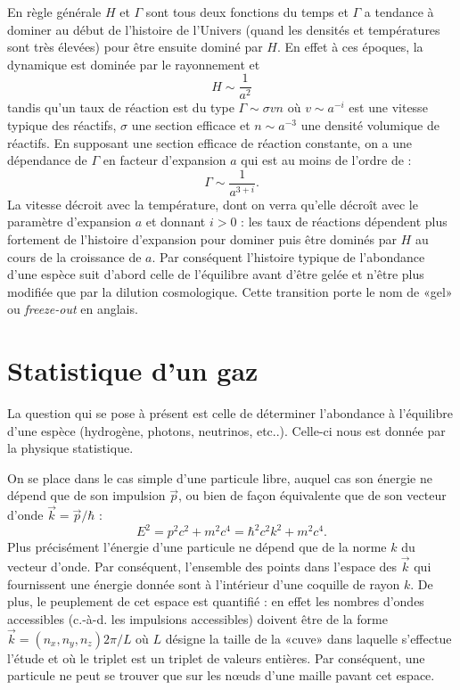 En règle générale $H$ et $\Gamma$ sont tous deux fonctions du temps et $\Gamma$ a tendance à dominer au début de l'histoire de l'Univers (quand les densités et températures sont très élevées) pour être ensuite dominé par $H$. En effet à ces époques, la dynamique est dominée par le rayonnement et 
\begin{equation}
H\sim\frac{1}{a^2}
\end{equation}
tandis qu'un taux de réaction est du type $\Gamma\sim \sigma v n$ où $v\sim a^{-i}$ est une vitesse typique des réactifs, $\sigma$ une section efficace et $n\sim a^{-3}$ une densité volumique de réactifs. En supposant une section efficace de réaction constante, on a une dépendance de $\Gamma$ en facteur d'expansion $a$ qui est au moins de l'ordre de :
\begin{equation}
\Gamma \sim \frac{1}{a^{3+i}}.
\end{equation}
La vitesse décroit avec la température, dont on verra qu'elle décroît avec le paramètre d'expansion $a$ et donnant $i>0$ : les taux de réactions dépendent plus fortement de l'histoire d'expansion pour dominer puis être dominés par $H$ au cours de la croissance de $a$. Par conséquent l'histoire typique de l'abondance d'une espèce suit d'abord celle de l'équilibre avant d'être gelée et n'être plus modifiée que par la dilution cosmologique. Cette transition porte le nom de «gel» ou \textit{freeze-out} en anglais.



\section{Statistique d'un gaz}
La question qui se pose à présent est celle de déterminer l'abondance à l'équilibre d'une espèce (hydrogène, photons, neutrinos, etc..). Celle-ci nous est donnée par la physique statistique.

On se place dans le cas simple d'une particule libre, auquel cas son énergie ne dépend que de son impulsion $\vec p$, ou bien de façon équivalente que de son vecteur d'onde $\vec k =\vec p /\hbar$ :
\begin{equation}
E^2=p^2c^2+m^2c^4=\hbar^2 c^2 k^2 +m^2c^4.
\end{equation}
 Plus précisément l'énergie d'une particule ne dépend que de la norme $k$ du vecteur d'onde. Par conséquent, l'ensemble des points dans l'espace des $\vec k$ qui fournissent une énergie donnée sont à l'intérieur d'une coquille de rayon $k$. De plus, le peuplement de cet espace est quantifié : en effet les nombres d'ondes accessibles (c.-à-d. les impulsions accessibles) doivent être de la forme $\vec k = (n_x,n_y,n_z) 2\pi/L $ où $L$ désigne la taille de la «cuve» dans laquelle s'effectue l'étude et où le triplet est un triplet de valeurs entières. Par conséquent, une particule ne peut se trouver que sur les nœuds d'une maille pavant cet espace. 

